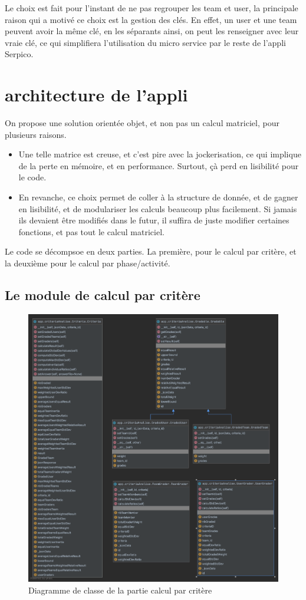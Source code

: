 \documentclass[colorised, sobre]{template} %
\def\ser{Serpico}
\def\usr{user}
\def\te{team}
\begin{document}
    Le choix est fait pour l'instant de ne pas regrouper les \te{} et \usr, la principale raison qui a motivé ce choix est la gestion des clés. En effet, un \usr{} et une \te{} peuvent avoir la même clé, en les séparants ainsi, on peut les renseigner avec leur vraie clé, ce qui simplifiera l'utilisation du micro service par le reste de l'appli \ser.
\section{architecture de l'appli}
    On propose une solution orientée objet, et non pas un calcul matriciel, pour plusieurs raisons.
    \begin{itemize}
        \item Une telle matrice est creuse, et c'est pire avec la jockerisation, ce qui implique de la perte en mémoire, et en performance. Surtout, çà perd en lisibilité pour le code.
        \item En revanche, ce choix permet de coller à la structure de donnée, et de gagner en lisibilité, et de modulariser les calculs beaucoup plus facilement. Si jamais ils devaient être modifiés dans le futur, il suffira de juste modifier certaines fonctions, et pas tout le calcul matriciel.
    \end{itemize}
    Le code se décompsoe en deux parties. La première, pour le calcul par critère, et la deuxième pour le calcul par phase/activité.

    \subsection{Le module de calcul par critère}
    \begin{figure}[H]
        \centering
        \includegraphics[width=15cm]{criteriaAnalise.png}
        \caption{Diagramme de classe de la partie calcul par critère}
    \end{figure}
    \newpage
\end{document}
